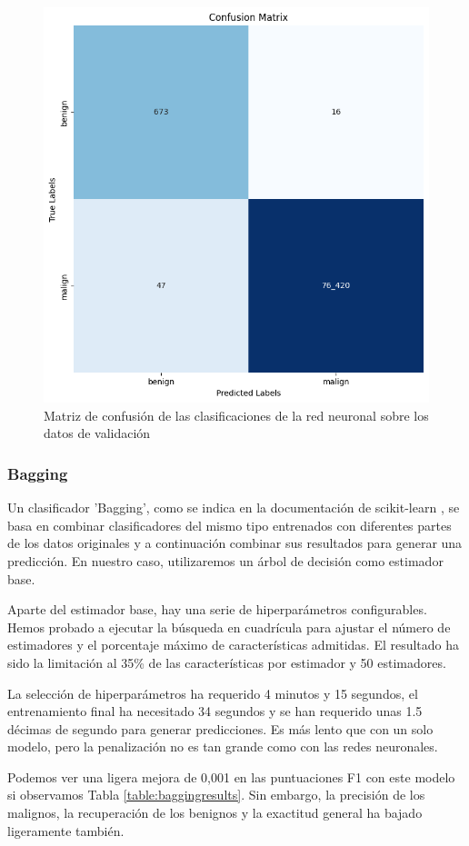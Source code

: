 \begin{figure}[H]
    \begin{center}
        \includegraphics[width=0.55\linewidth]{media/packet_pincer_train_models_voting_classifier.png}
    \end{center}
    \caption{Matriz de confusión de las clasificaciones de la red neuronal sobre los datos de validación}\label{fig:votingmatrix}
\end{figure}

\subsubsection{Bagging} %

Un clasificador 'Bagging', como se indica en la documentación de scikit-learn \cite{sklearnbagging}, se basa en combinar clasificadores del mismo tipo entrenados con diferentes partes de los datos originales y a continuación combinar sus resultados para generar una predicción. En nuestro caso, utilizaremos un árbol de decisión como estimador base.

Aparte del estimador base, hay una serie de hiperparámetros configurables. Hemos probado a ejecutar la búsqueda en cuadrícula para ajustar el número de estimadores y el porcentaje máximo de características admitidas. El resultado ha sido la limitación al 35\% de las características por estimador y 50 estimadores.

La selección de hiperparámetros ha requerido 4 minutos y 15 segundos, el entrenamiento final ha necesitado 34 segundos y se han requerido unas 1.5 décimas de segundo para generar predicciones. Es más lento que con un solo modelo, pero la penalización no es tan grande como con las redes neuronales.

Podemos ver una ligera mejora de 0,001 en las puntuaciones F1 con este modelo si observamos Tabla \ref{table:baggingresults}. Sin embargo, la precisión de los malignos, la recuperación de los benignos y la exactitud general ha bajado ligeramente también.


